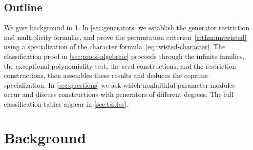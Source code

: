 \documentclass[11pt]{amsart}
\theoremstyle{definition}
\begin{document}
 

%



%

\subsection{Outline}
We give background in \cref{sec:background}. In \cref{sec:generators}
we establish the generator restriction and multiplicity formulas, and
prove the permutation criterion~\cref{c:thm:untwisted} using a
specialization of the character formula~\cref{eq:twisted-character}. The classification proof
in \cref{sec:proof-algebraic} proceeds through the infinite families,
the exceptional polynomiality test, the seed constructions, and the
restriction constructions, then assembles these results and deduces
the coprime specialization. In \cref{sec:questions} we ask which
nonfaithful parameter modules occur and discuss constructions with
generators of different degrees. The full classification tables
appear in \cref{sec:tables}.


\section{Background}\label{sec:background}
\end{document}
